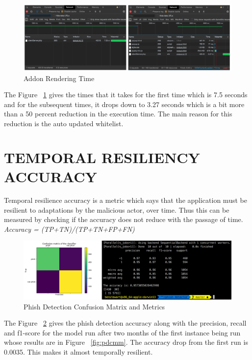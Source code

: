 \begin{figure}[htp]
\centering
\includegraphics[scale=0.25]{Figures/image14.png}
\caption{Addon Rendering Time}
\label{fig:art}
\end{figure}

The Figure  ~\ref{fig:art} gives the times that it takes for the first time which is 7.5 seconds and for the subsequent times, it drops down to 3.27 seconds which is a bit more than a 50 percent reduction in the execution time. The main reason for this reduction is the auto updated whitelist.

\section{TEMPORAL RESILIENCY ACCURACY}
Temporal resilience accuracy is a metric which says that the application must be resilient to adaptations by the malicious actor, over time. Thus this can be measured by checking if the accuracy does not reduce with the passage of time.\\
\null\quad\textit{Accuracy = (TP+TN)/(TP+TN+FP+FN)}\\

\begin{figure}[htp]
\centering
\includegraphics[scale=0.2]{Figures/image8.png}
\caption{Phish Detection Confusion Matrix and Metrics}
\label{fig:pdcmm2}
\end{figure}

The Figure  ~\ref{fig:pdcmm2} gives the phish detection accuracy along with the precision, recall and f1-score for the model run after two months of the first instance being run whose results are in Figure ~\ref{fig:pdcmm}. The accuracy drop from the first run is 0.0035. This makes it almost temporally resilient.

